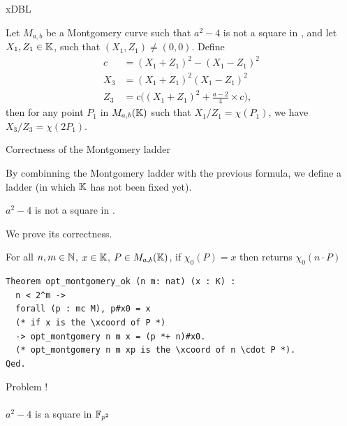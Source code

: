 \documentclass[8pt,aspectratio=169]{beamer}
\begin{document}
%
%
\begin{frame}{xDBL}
  \begin{lemma}
  Let $M_{a,b}$ be a Montgomery curve such that $a^2-4$ is not a square in \K, and
  let $X_1, Z_1 \in \mathbb{K}$, such that $(X_1,Z_1) \neq (0,0)$. Define
  \begin{align*}
    c &= (X_1 + Z_1)^2 - (X_1 - Z_1)^2\\
  X_3 &= (X_1 + Z_1)^2(X_1-Z_1)^2\\
  Z_3 &= c\Big((X_1 + Z_1)^2+\frac{a-2}{4}\times c\Big),
  \end{align*}
  then for any point $P_1$ in $M_{a,b}(\mathbb{K})$ such that $X_1/Z_1 = \chi(P_1)$,
  we have $X_3/Z_3 = \chi(2P_1)$.
  \end{lemma}
\end{frame}


%
%
\begin{frame}[fragile]{Correctness of the Montgomery ladder}

  By combinning the Montgomery ladder with the previous formula, we define a ladder  (in which $\mathbb{K}$ has not been fixed yet).

  \begin{hypothesis}
    $a^2-4$ is not a square in \K.
  \end{hypothesis}

  We prove its correctness.
  \begin{theorem}
  \label{thm:montgomery-ladder-correct}
  For all $n, m \in \mathbb{N}$, $x \in \mathbb{K}$, $P \in M_{a,b}(\mathbb{K})$,
  if $\chi_0(P) = x$ then  returns $\chi_0(n \cdot P)$
  \end{theorem}
  \begin{lstlisting}[language=Coq, basicstyle=\normalsize]
Theorem opt_montgomery_ok (n m: nat) (x : K) :
  n < 2^m ->
  forall (p : mc M), p#x0 = x
  (* if x is the \xcoord of P *)
  -> opt_montgomery n m x = (p *+ n)#x0.
  (* opt_montgomery n m xp is the \xcoord of n \cdot P *).
Qed.
  \end{lstlisting}

\end{frame}


%
%
\begin{frame}[standout]
\begin{center}
{  \huge
  Problem !\\~\\
  $a^2-4$ is a square in $\mathbb{F}_{p^2}$}
\end{center}
\end{frame}
\end{document}
